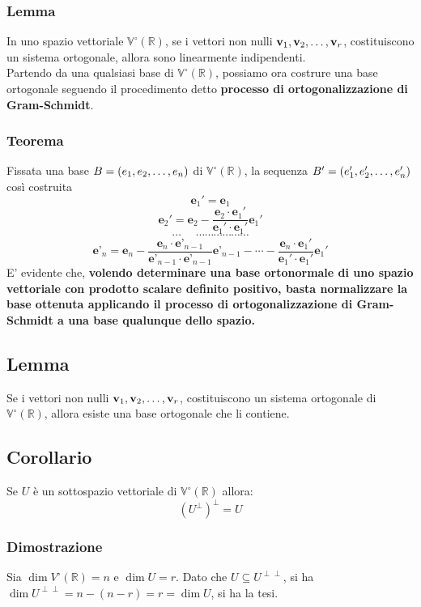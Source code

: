 \documentclass[../main.tex]{subfiles}
\begin{document}
\subsubsection{Lemma}
In uno spazio vettoriale $\mathbb{V}^{\circ}(\mathbb{R})$, se i vettori non
nulli $\textbf{v}_1, \textbf{v}_2, \ldots, \textbf{v}_{r}$, costituiscono un sistema ortogonale, allora sono
linearmente indipendenti.\\ Partendo da una qualsiasi base di
$\mathbb{V}^{\circ}(\mathbb{R})$, possiamo ora costrure una base ortogonale
seguendo il procedimento detto \textbf{processo di ortogonalizzazione di
    Gram-Schmidt}.\\

\subsubsection{Teorema}
Fissata una base $B = (e_1, e_2, \ldots, e_{n})$ di $\mathbb{V}^{\circ}(\mathbb{R})$, la
sequenza $B' = (e'_1, e'_2, \ldots, e'_{n})$ così costruita
\[
    \textbf{e}_1' = \textbf{e}_1
\]
\[
    \textbf{e}_2' = \textbf{e}_2 - \dfrac{\textbf{e}_2\cdot\textbf{e}_1'}{\textbf{e}_1'\cdot\textbf{e}_1'}\textbf{e}_1'
\]
\[
    \cdots \ \ \ \ \ \ \cdots\cdots\cdots\cdots\cdots\cdots
\]
\[
    \textbf{e'}_n = \textbf{e}_n - \dfrac{\textbf{e}_n\cdot\textbf{e'}_{n-1}}{\textbf{e'}_{n-1}\cdot\textbf{e'}_{n-1}}\textbf{e'}_{n-1} - \cdots - \dfrac{\textbf{e}_n\cdot\textbf{e}_1'}{\textbf{e}_1'\cdot\textbf{e}_1'}\textbf{e}_1'
\]
E' evidente che, \textbf{volendo determinare una base ortonormale di uno spazio
    vettoriale con prodotto scalare definito positivo, basta normalizzare la base
    ottenuta applicando il processo di ortogonalizzazione di Gram-Schmidt a una
    base qualunque dello spazio.}

\subsection{Lemma}
Se i vettori non nulli $\textbf{v}_1, \textbf{v}_2, \ldots, \textbf{v}_{r}$, costituiscono un sistema ortogonale
di $\mathbb{V}^{\circ}(\mathbb{R})$, allora esiste una base ortogonale che li
contiene.

\subsection{Corollario}
Se $U$ è un sottospazio vettoriale di $\mathbb{V}^{\circ}(\mathbb{R})$ allora:
\[
    (U^{\perp})^{\perp} = U\]

\subsubsection{Dimostrazione}
Sia $\dim V^{\circ} (\mathbb{R}) = n$ e $\dim U = r$. Dato che $U\subseteq
    U^{\perp\perp}$, si ha $\dim U^{\perp\perp} = n-(n-r) = r = \dim U$, si ha la
tesi.
\end{document}

